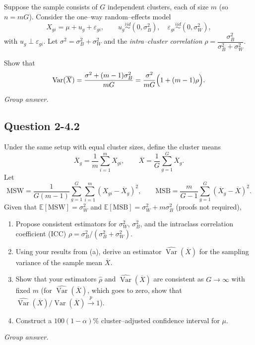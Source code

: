 \documentclass[11pt,letterpaper]{article}
\newcommand{\Var}{\operatorname{Var}}
\newcommand{\E}{\mathbb{E}}
\newenvironment{groupanswer}
  {\par\smallskip\noindent\textit{Group answer.}\par\nopagebreak\smallskip}
  {\par\medskip}
\begin{document}
\label{q:lec2-4-1}


Suppose the sample consists of $G$ independent clusters, each of size $m$ (so $n=mG$). Consider the one–way random–effects model
\[
X_{gi}=\mu+u_g+\varepsilon_{gi},\qquad u_g\stackrel{iid}{\sim}(0,\sigma_B^2),\quad \varepsilon_{gi}\stackrel{iid}{\sim}(0,\sigma_W^2),
\]
with $u_g\perp \varepsilon_{gi}$. Let $\sigma^2=\sigma_B^2+\sigma_W^2$ and the \emph{intra–cluster correlation} $\rho=\dfrac{\sigma_B^2}{\sigma_B^2+\sigma_W^2}$.

Show that
\[
\Var(\overline{X}) = \frac{\sigma^2+(m-1)\sigma_B^2}{mG}
= \frac{\sigma^2}{mG}\Bigl(1+(m-1)\rho\Bigr).
\]


\begin{groupanswer}
\vspace{\baselineskip}
\end{groupanswer}


\subsection*{Question 2-4.2}

\label{q:lec2-4-2}


Under the same setup with equal cluster sizes, define the cluster means
\[
\overline{X}_g=\frac{1}{m}\sum_{i=1}^m X_{gi},\qquad
\overline{X}=\frac{1}{G}\sum_{g=1}^G\overline{X}_g.
\]
Let
\[
\text{MSW}=\frac{1}{G(m-1)}\sum_{g=1}^G\sum_{i=1}^m (X_{gi}-\overline{X}_g)^2,\qquad
\text{MSB}=\frac{m}{G-1}\sum_{g=1}^G(\overline{X}_g-\overline{X})^2.
\]
Given that $\E[\text{MSW}]=\sigma_W^2$ and $\E[\text{MSB}]=\sigma_W^2+m\sigma_B^2$ (proofs not required),

\begin{enumerate}
\item[(a)] Propose consistent estimators for $\sigma_W^2$, $\sigma_B^2$, and the intraclass correlation coefficient (ICC) $\rho=\sigma_B^2/(\sigma_B^2+\sigma_W^2)$.
\item[(b)] Using your results from (a), derive an estimator $\widehat{\Var}(\overline{X})$ for the sampling variance of the sample mean $\overline{X}$.
\item[(c)] Show that your estimators $\widehat{\rho}$ and $\widehat{\Var}(\overline{X})$ are consistent as $G\to\infty$ with fixed $m$ (for $\widehat{\Var}(\overline{X})$, which goes to zero, show that $\widehat{\Var}(\overline{X})/\Var(\overline{X})\xrightarrow{p}1$).
\item[(d)] Construct a $100(1-\alpha)\%$ cluster–adjusted confidence interval for $\mu$.
\end{enumerate}


\begin{groupanswer}
\vspace{\baselineskip}
\end{groupanswer}
\end{document}

